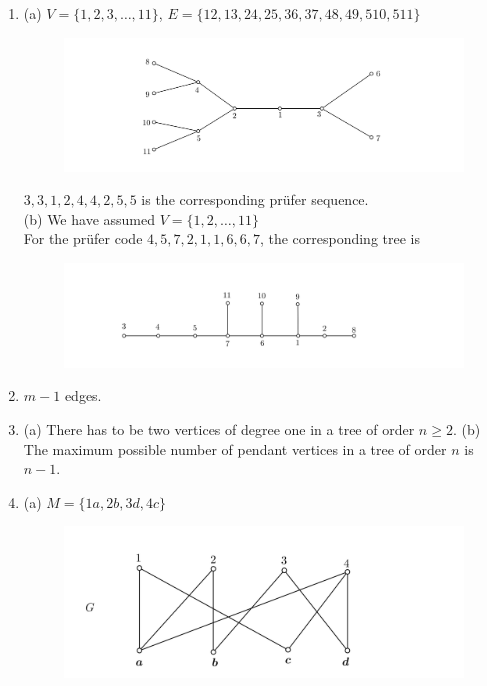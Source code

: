 \documentclass[paper=a4, fontsize=11pt,twoside]{scrartcl}		%
\theoremstyle{definition}
\theoremstyle{remark}
\begin{document}
\begin{enumerate}
  \item (a) $V=\{1,2,3,\ldots,11\}$, $E=\{12,13,24,25,36,37,48,49,510,511\}$
  \begin{figure}[hbt!]
\centering
\includegraphics[width=1.0\textwidth]{SolGrapAssp7.png}
\end{figure}

  $3,3,1,2,4,4,2,5,5$ is the corresponding pr\"{u}fer sequence.\\

  (b) We have assumed $V=\{1,2,\ldots,11\}$\\
  For the pr\"{u}fer code $4,5,7,2,1,1,6,6,7$, the corresponding tree is
  \begin{figure}[hbt!]
\centering
\includegraphics[width=1.0\textwidth]{SolGrapAssp7b.png}
\end{figure}

  \item $m-1$ edges.

  \item (a) There has to be two vertices of degree one in a tree of order $n\geq2$.
  (b) The maximum possible number of pendant vertices in a tree of order $n$ is $n-1$.

  \item (a) $M=\{1a,2b,3d,4c\}$
  \begin{figure}[hbt!]
\centering
\includegraphics[width=.8\textwidth]{SolGrapAssp10a.png}
\end{figure}


\end{enumerate}
\end{document}
